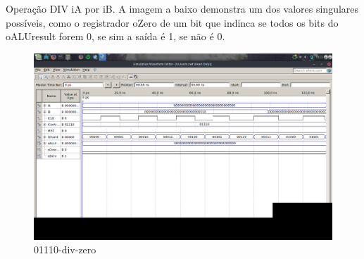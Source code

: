 \documentclass[12pt]{article}
\begin{document}
Operação DIV iA por iB.
A imagem a baixo demonstra um dos valores singulares possíveis, como o registrador oZero de um bit que indinca se todos os bits do oALUresult forem 0, se sim a saída é 1, se não é 0.
\begin{figure}[H]
	\centering
	\includegraphics[width=.8\textwidth]{01110-div-zero.png}
	\caption{01110-div-zero}
	\label{fig:01110-div-zero}
\end{figure}
\end{document}
